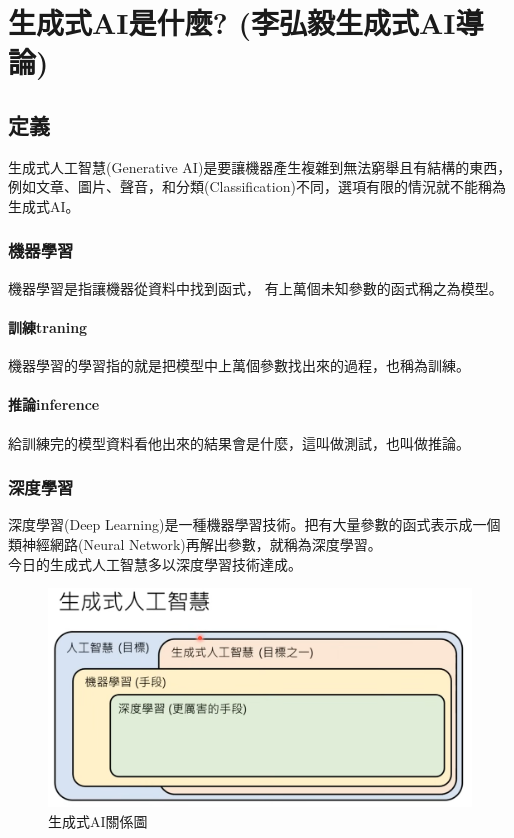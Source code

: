 \chapter{生成式AI是什麼? (李弘毅生成式AI導論)}
\section{定義}
生成式人工智慧(Generative AI)是要讓機器產生複雜到無法窮舉且有結構的東西，例如文章、圖片、聲音，和分類(Classification)不同，選項有限的情況就不能稱為生成式AI。
\subsection{機器學習}
機器學習是指讓機器從資料中找到函式，
有上萬個未知參數的函式稱之為模型。
\subsubsection{訓練traning}
機器學習的學習指的就是把模型中上萬個參數找出來的過程，也稱為訓練。
\subsubsection{推論inference}
給訓練完的模型資料看他出來的結果會是什麼，這叫做測試，也叫做推論。

\subsection{深度學習}
深度學習(Deep Learning)是一種機器學習技術。把有大量參數的函式表示成一個類神經網路(Neural Network)再解出參數，就稱為深度學習。\\
今日的生成式人工智慧多以深度學習技術達成。

\begin{figure}[htbp!]
    \centering
    \includegraphics[width=0.5\linewidth]{images/w4/GAI.png}
    \caption{生成式AI關係圖}
    \label{fig:GAI}
\end{figure}

